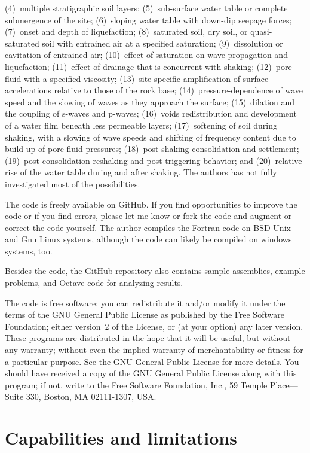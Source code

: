 \documentclass[letterpaper,11pt]{article}
\begin{document}
(4)~multiple stratigraphic soil layers;
(5)~sub-surface water table or complete submergence of the site;
(6)~sloping water table with down-dip seepage forces;
(7)~onset and depth of liquefaction;
(8)~saturated soil, dry soil, or quasi-saturated soil with entrained air
at a specified saturation;
(9)~dissolution or cavitation of entrained air;
(10)~effect of saturation on wave propagation and liquefaction;
(11)~effect of drainage that is concurrent with shaking;
(12)~pore fluid with a specified viscosity;
(13)~site-specific
amplification of surface accelerations relative
to those of the rock base;
(14)~pressure-dependence of wave speed
and the slowing of
waves as they approach the surface;
(15)~dilation and the coupling of s-waves and p-waves;
(16)~voids redistribution and
development of a water film beneath less permeable layers;
(17)~softening of soil during shaking,
with a slowing of wave speeds and shifting of frequency content due
to build-up of pore fluid pressures;
(18)~post-shaking consolidation and settlement;
(19)~post-consolidation reshaking and post-triggering behavior; and
(20)~relative rise of the water table during and after shaking.
The authors has not fully investigated most of the possibilities.
%
\par
The code is freely available on GitHub.
If you find opportunities to improve the code or if you find errors,
please let me know or fork the code and
augment or correct the code yourself.
The author
compiles the Fortran code on BSD Unix and Gnu Linux systems,
although the code can likely be compiled on windows systems, too.
%
\par
Besides the code, the GitHub repository also
contains sample assemblies, example problems, and
Octave code for analyzing results.
%
\par
The code is free software; 
you can redistribute it and/or
modify it under the terms of the GNU General Public License
as published by the Free Software Foundation; either version~2
of the License, or (at your option) any later version.
These programs are distributed in the hope that it will be useful,
but without any warranty; without even the implied warranty of
merchantability or fitness for a particular purpose.
See the GNU General Public License for more details.
You should have received a copy of the GNU General Public License
along with this program; if not, write to the Free Software
Foundation, Inc., 59 Temple Place---Suite 330,
Boston, MA  02111-1307, USA.
%
\pagebreak
\tableofcontents
%
\pagebreak
\section{Capabilities and limitations}\label{sec:Capabilities}
\end{document}
